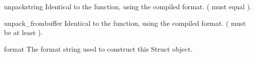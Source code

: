 \begin{methoddesc}[Struct]{unpack}{string}
  Identical to the  function, using the compiled format.
  ( must equal ).
\end{methoddesc}

\begin{methoddesc}[Struct]{unpack_from}{buffer}
  Identical to the  function, using the compiled format.
  ( must be at least ).
\end{methoddesc}

\begin{memberdesc}[Struct]{format}
  The format string used to construct this Struct object.
\end{memberdesc}

